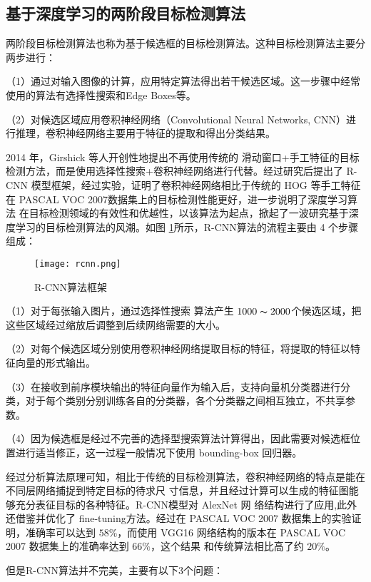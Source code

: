\subsection{基于深度学习的两阶段目标检测算法}
两阶段目标检测算法也称为基于候选框的目标检测算法。这种目标检测算法主要分两步进行：

（1）通过对输入图像的计算，应用特定算法得出若干候选区域。这一步骤中经常使用的算法有选择性搜索和Edge Boxes等。

（2）对候选区域应用卷积神经网络（Convolutional Neural Networks, CNN）进行推理，卷积神经网络主要用于特征的提取和得出分类结果。

2014 年，Girshick 等人开创性地提出不再使用传统的
滑动窗口+手工特征的目标检测方法，而是使用选择性搜索+卷积神经网络进行代替。经过研究后提出了 R-CNN 模型框架\cite{girshick2014rich}，经过实验，证明了卷积神经网络相比于传统的 HOG
等手工特征在 PASCAL VOC 2007数据集上的目标检测性能更好，进一步说明了深度学习算法
在目标检测领域的有效性和优越性，以该算法为起点，掀起了一波研究基于深度学习的目标检测算法的风潮。如图
\ref{rcnn}所示，R-CNN算法的流程主要由 4 个步骤组成：

\begin{figure}[htbp]
    \centering
    \texttt{[image: rcnn.png]}
    \caption{R-CNN算法框架}
    \label{rcnn}
\end{figure}

（1）对于每张输入图片，通过选择性搜索
算法产生 $1000\thicksim2000$个候选区域，把这些区域经过缩放后调整到后续网络需要的大小。

（2）对每个候选区域分别使用卷积神经网络提取目标的特征，将提取的特征以特征向量的形式输出。

（3）在接收到前序模块输出的特征向量作为输入后，支持向量机分类器进行分类，对于每个类别分别训练各自的分类器，各个分类器之间相互独立，不共享参数。

（4）因为候选框是经过不完善的选择型搜索算法计算得出，因此需要对候选框位置进行适当修正，这一过程一般情况下使用 bounding-box 回归器。

经过分析算法原理可知，相比于传统的目标检测算法，卷积神经网络的特点是能在不同层网络捕捉到特定目标的待求尺
寸信息，并且经过计算可以生成的特征图能够充分表征目标的各种特征。R-CNN模型对 AlexNet 网
络结构进行了应用,此外还借鉴并优化了 fine-tuning方法。经过在 PASCAL VOC 2007 数据集上的实验证明，准确率可以达到 $58\%$，而使用 VGG16 网络结构的版本在 PASCAL VOC 2007 数据集上的准确率达到 $66\%$，这个结果
和传统算法相比高了约 $20\%$。

但是R-CNN算法并不完美，主要有以下3个问题：

